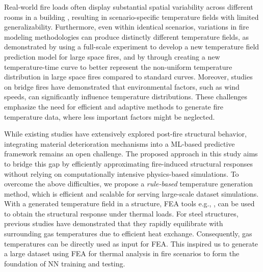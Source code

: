 {Real-world fire loads often display substantial spatial variability across different rooms in a building \cite{dundar_fire_2023}, resulting in scenario-specific temperature fields with limited generalizability. Furthermore, even within identical scenarios, variations in fire modeling methodologies can produce distinctly different temperature fields, as demonstrated by \cite{zhang_temperature_2020} using a full-scale experiment to develop a new temperature field prediction model for large space fires, and by \cite{du_new_2012} through creating a new temperature-time curve to better represent the non-uniform temperature distribution in large space fires compared to standard curves. Moreover, studies on bridge fires \cite{he_study_2024} have demonstrated that environmental factors, such as wind speeds, can significantly influence temperature distributions. These challenges emphasize the need for efficient and adaptive methods to generate fire temperature data, where less important factors might be neglected. 

While existing studies have extensively explored post-fire structural behavior, integrating material deterioration mechanisms into a ML-based predictive framework remains an open challenge. The proposed approach in this study aims to bridge this gap by efficiently approximating fire-induced structural responses without relying on computationally intensive physics-based simulations. To overcome the above difficulties, we propose a {\em{rule-based}} temperature generation method, which is efficient and scalable for serving large-scale dataset simulations. With a generated temperature field in a structure, FEA tools e.g., \cite{yu_objectoriented_1993}, can be used to obtain the structural response under thermal loads. For steel structures, previous studies \cite{nan_structuralfire_2023} have demonstrated that they rapidly equilibrate with surrounding gas temperatures due to efficient heat exchange. Consequently, gas temperatures can be directly used as input for FEA. This inspired us to generate a large dataset using FEA for thermal analysis in fire scenarios to form the foundation of NN training and testing. 



}

